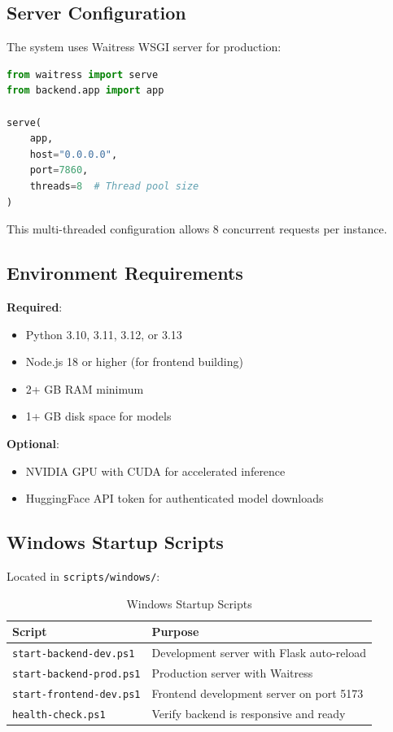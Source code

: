 \documentclass[12pt,a4paper]{book}
\begin{document}
\begin{itemize}
\subsection{Server Configuration}

The system uses Waitress WSGI server for production:

\begin{lstlisting}[language=Python]
from waitress import serve
from backend.app import app

serve(
    app,
    host="0.0.0.0",
    port=7860,
    threads=8  # Thread pool size
)
\end{lstlisting}

This multi-threaded configuration allows 8 concurrent requests per instance.

\subsection{Environment Requirements}

\textbf{Required}:
\begin{itemize}
    \item Python 3.10, 3.11, 3.12, or 3.13
    \item Node.js 18 or higher (for frontend building)
    \item 2+ GB RAM minimum
    \item 1+ GB disk space for models
\end{itemize}

\textbf{Optional}:
\begin{itemize}
    \item NVIDIA GPU with CUDA for accelerated inference
    \item HuggingFace API token for authenticated model downloads
\end{itemize}

\subsection{Windows Startup Scripts}

Located in \texttt{scripts/windows/}:

\begin{table}[H]
\centering
\captionsetup{justification=centering}
\caption{Windows Startup Scripts}
\begin{tabular}{|l|p{5cm}|}
\hline
\textbf{Script} & \textbf{Purpose} \\
\hline
\texttt{start-backend-dev.ps1} & Development server with Flask auto-reload \\
\hline
\texttt{start-backend-prod.ps1} & Production server with Waitress \\
\hline
\texttt{start-frontend-dev.ps1} & Frontend development server on port 5173 \\
\hline
\texttt{health-check.ps1} & Verify backend is responsive and ready \\
\hline
\end{tabular}
\end{table}


\end{itemize}
\end{document}
